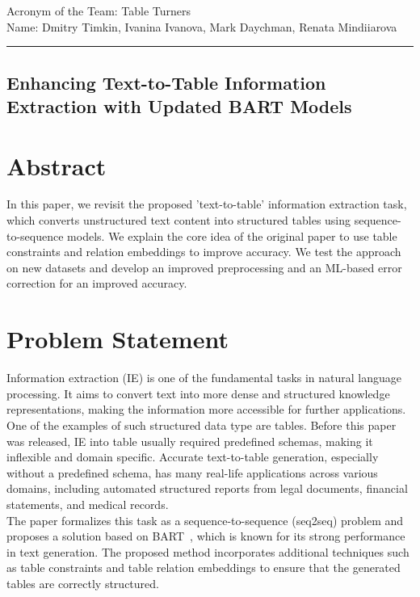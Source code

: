 \documentclass[12pt,a4paper]{article}
\begin{document}
\noindent Acronym of the Team: Table Turners\\
Name:	Dmitry Timkin, Ivanina Ivanova, Mark Daychman, Renata Mindiiarova

{\centering\rule{\linewidth}{.5pt}}


\begin{center}
\section*{Enhancing Text-to-Table Information Extraction with Updated BART Models}
\end{center}
\section*{Abstract}
In this paper, we revisit the proposed 'text-to-table' information extraction task, which converts unstructured text content into structured tables using sequence-to-sequence models. We explain the core idea of the original paper \cite{wu2022texttotablenewwayinformation} to use table constraints and relation embeddings to improve accuracy. We test the approach on new datasets and develop an improved preprocessing and an ML-based error correction for an improved accuracy. 

\section*{Problem Statement}
Information extraction (IE) is one of the fundamental tasks in natural language processing. It aims to convert text into more dense and structured knowledge representations, making the information more accessible for further applications. One of the examples of such structured data type are tables. Before this paper was released, IE into table usually required predefined schemas, making it inflexible and domain specific. Accurate text-to-table generation, especially without a predefined schema, has many real-life applications across various domains, including automated structured reports from legal documents, financial statements, and medical records. 
\ \\

The paper formalizes this task as a sequence-to-sequence (seq2seq) problem and proposes a solution based on BART~\cite{lewis2019bart}, which is known for its strong performance in text generation. The proposed method incorporates additional techniques such as table constraints and table relation embeddings to ensure that the generated tables are correctly structured. 
\ \\
\end{document}
